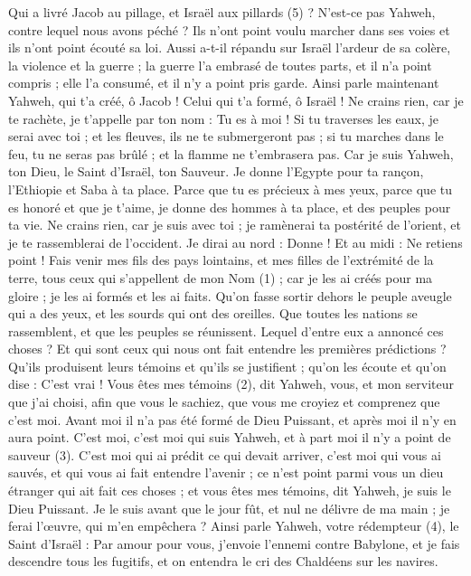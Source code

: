 \begin{multicols}{2}
Qui a livré Jacob au pillage, et Israël aux pillards (5) ? N'est-ce pas Yahweh, contre lequel nous avons péché ? Ils n’ont point voulu marcher dans ses voies et ils n’ont point écouté sa loi.
Aussi a-t-il répandu sur Israël l’ardeur de sa colère, la violence et la guerre ; la guerre l’a embrasé de toutes parts, et il n’a point compris ; elle l’a consumé, et il n’y a point pris garde.
\VerseOne{}Ainsi parle maintenant Yahweh, qui t'a créé, ô Jacob ! Celui qui t'a formé, ô Israël ! Ne crains rien, car je te rachète, je t’appelle par ton nom : Tu es à moi !
Si tu traverses les eaux, je serai avec toi ; et les fleuves, ils ne te submergeront pas ; si tu marches dans le feu, tu ne seras pas brûlé ; et la flamme ne t'embrasera pas.
Car je suis Yahweh, ton Dieu, le Saint d'Israël, ton Sauveur. Je donne l'Egypte pour ta rançon, l’Ethiopie et Saba à ta place.
Parce que tu es précieux à mes yeux, parce que tu es honoré et que je t’aime, je donne des hommes à ta place, et des peuples pour ta vie.
Ne crains rien, car je suis avec toi ; je ramènerai ta postérité de l’orient, et je te rassemblerai de l’occident.
Je dirai au nord : Donne ! Et au midi : Ne retiens point ! Fais venir mes fils des pays lointains, et mes filles de l’extrémité de la terre,
tous ceux qui s’appellent de mon Nom (1) ; car je les ai créés pour ma gloire ; je les ai formés et les ai faits.
Qu’on fasse sortir dehors le peuple aveugle qui a des yeux, et les sourds qui ont des oreilles.
Que toutes les nations se rassemblent, et que les peuples se réunissent. Lequel d'entre eux a annoncé ces choses ? Et qui sont ceux qui nous ont fait entendre les premières prédictions ? Qu'ils produisent leurs témoins et qu'ils se justifient ; qu'on les écoute et qu’on dise : C’est vrai !
Vous êtes mes témoins (2), dit Yahweh, vous, et mon serviteur que j'ai choisi, afin que vous le sachiez, que vous me croyiez et comprenez que c'est moi. Avant moi il n’a pas été formé de Dieu Puissant, et après moi il n'y en aura point.
C'est moi, c'est moi qui suis Yahweh, et à part moi il n'y a point de sauveur (3).
C'est moi qui ai prédit ce qui devait arriver, c'est moi qui vous ai sauvés, et qui vous ai fait entendre l'avenir ; ce n’est point parmi vous un dieu étranger qui ait fait ces choses ; et vous êtes mes témoins, dit Yahweh, je suis le Dieu Puissant.
Je le suis avant que le jour fût, et nul ne délivre de ma main ; je ferai l’œuvre, qui m'en empêchera ?
Ainsi parle Yahweh, votre rédempteur (4), le Saint d'Israël : Par amour pour vous, j’envoie l’ennemi contre Babylone, et je fais descendre tous les fugitifs, et on entendra le cri des Chaldéens sur les navires.

\end{multicols}
